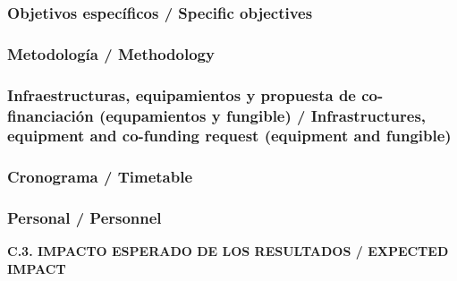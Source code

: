 \documentclass[a4paper,11pt,oneside]{article}
\begin{document}



\subsubsection*{Objetivos específicos / Specific objectives}
%






\subsubsection*{Metodolog\'ia / Methodology}


 
 
 
 

\subsubsection*{Infraestructuras, equipamientos y propuesta de co-financiaci\'on (equpamientos y fungible) / Infrastructures, equipment and co-funding request (equipment and fungible)}




\subsubsection*{Cronograma / Timetable}




\subsubsection*{Personal / Personnel}



\vspace{12pt}

\noindent\textbf{C.3. IMPACTO ESPERADO DE LOS RESULTADOS / EXPECTED IMPACT}
\end{document}
